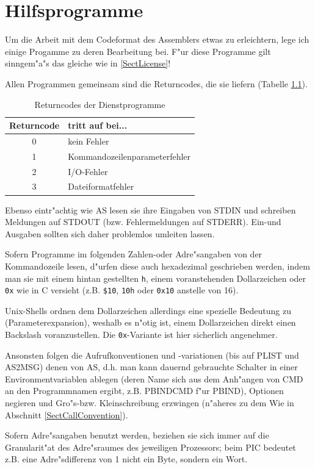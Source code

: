 \documentclass[12pt,a4paper,twoside]{report}
\newcommand{\tty}[1]{{\tt #1}}
\newcommand{\asname}{AS}
\begin{document}

\cleardoublepage
\chapter{Hilfsprogramme}
\label{ChapTools}

Um die Arbeit mit dem Codeformat des Assemblers etwas zu erleichtern,
lege ich einige Progamme zu deren Bearbeitung bei.  F"ur diese Programme
gilt sinngem"a"s das gleiche wie in \ref{SectLicense}!

Allen Programmen gemeinsam sind die Returncodes, die sie liefern (Tabelle
\ref{TabToolReturns}).
\par
\begin{table}[ht]
\begin{center}\begin{tabular}{|c|l|}
\hline
Returncode &  tritt auf bei... \\
\hline
\hline
0          &  kein Fehler \\
1          &  Kommandozeilenparameterfehler \\
2          &  I/O-Fehler \\
3          &  Dateiformatfehler \\
\hline
\end{tabular}\end{center}
\caption{Returncodes der Dienstprogramme\label{TabToolReturns}}
\end{table}
Ebenso eintr"achtig wie \asname{} lesen sie ihre Eingaben von STDIN und schreiben
Meldungen auf STDOUT (bzw. Fehlermeldungen auf STDERR).  Ein-und
Ausgaben sollten sich daher problemlos umleiten lassen.
\par
Sofern Programme im folgenden Zahlen-oder Adre"sangaben von der
Kommandozeile lesen, d"urfen diese auch hexadezimal geschrieben werden,
indem man sie mit einem hintan gestellten \tty{h}, einem voranstehenden
Dollarzeichen oder \tty{0x} wie in C versieht (z.B. \verb!$10!,
\verb!10h! oder \verb!0x10! anstelle von 16).
\par
Unix-Shells  ordnen dem Dollarzeichen allerdings
eine spezielle Bedeutung zu (Parameterexpansion), weshalb es n"otig ist,
einem Dollarzeichen direkt einen Backslash voranzustellen.  Die
\tty{0x}-Variante ist hier sicherlich angenehmer.
\par
Ansonsten folgen die Aufrufkonventionen und -variationen (bis auf PLIST
und AS2MSG) denen von \asname{}, d.h. man kann dauernd gebrauchte Schalter in
einer Environmentvariablen ablegen (deren Name sich aus dem Anh"angen von
CMD an den Programmnamen ergibt, z.B. PBINDCMD f"ur PBIND), Optionen
negieren und Gro"s-bzw. Kleinschreibung erzwingen (n"aheres zu dem Wie in
Abschnitt \ref{SectCallConvention}).
\par
Sofern Adre"sangaben benutzt werden, beziehen sie sich immer auf die
Granularit"at des Adre"sraumes des jeweiligen Prozessors; beim PIC bedeutet
z.B. eine Adre"sdifferenz von 1 nicht ein Byte, sondern ein Wort.
\end{document}
